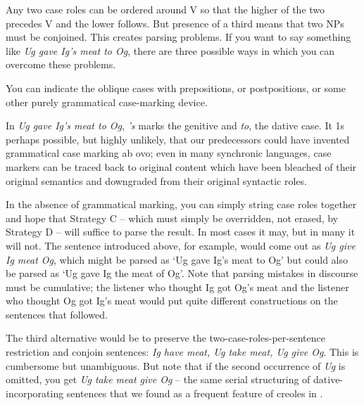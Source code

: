 Any two case roles can be ordered around V so that the higher of the two precedes V and the lower follows. But presence of a third means that two NPs must be conjoined. This creates parsing problems. If you want to say something like \textit{Ug gave Ig's meat to Og}, there are three possible ways in which you can overcome these problems.

You can indicate the oblique cases with prepositions, or postpositions, or some other purely grammatical case-marking device.

In \textit{Ug gave Ig's meat to Og}, \textit{'s} marks the genitive and \textit{to}, the dative case. It 1s perhaps possible, but highly unlikely, that our predecessors could have invented grammatical case marking ab ovo; even in many synchronic languages, case markers can be traced back to original content which have been bleached of their original semantics and downgraded from their original syntactic roles.

In the absence of grammatical marking, you can simply string case roles together and hope that Strategy C -- which must simply be overridden, not erased, by Strategy D -- will suffice to parse the result. In most cases it may, but in many it will not. The sentence introduced above, for example, would come out as \textit{Ug give Ig meat Og}, which might be parsed as `Ug gave Ig's meat to Og' but could also be parsed as `Ug gave Ig the meat of Og'. Note that parsing mistakes in discourse must be cumulative; the listener who thought Ig got Og's meat and the listener who thought Og got Ig's meat would put quite different constructions on the sentences that followed.

The third alternative would be to preserve the two-case-roles-per-sentence restriction and conjoin sentences: \textit{Ig have meat, Ug take meat, Ug give Og}. This is cumbersome but unambiguous. But note that if the second occurrence of \textit{Ug} is omitted, you get \textit{Ug take meat give Og} -- the same serial structuring of dative-incorporating sentences that we found as a frequent feature of creoles in .

